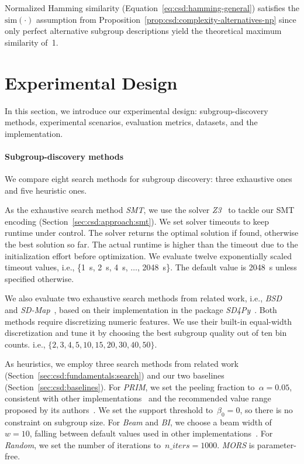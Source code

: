 \documentclass[acmsmall]{acmart} %
\theoremstyle{acmplain}
\theoremstyle{acmdefinition}
\begin{document}
%
Normalized Hamming similarity (Equation~\ref{eq:csd:hamming-general}) satisfies the $\text{sim}(\cdot)$ assumption from Proposition~\ref{prop:csd:complexity-alternatives-np} since only perfect alternative subgroup descriptions yield the theoretical maximum similarity of~1.

\section{Experimental Design}
\label{sec:csd:experimental-design}

In this section, we introduce our experimental design:
subgroup-discovery methods, experimental scenarios, evaluation metrics, datasets, and the implementation.

\paragraph{Subgroup-discovery methods}

We compare eight search methods for subgroup discovery:
three exhaustive ones and five heuristic ones.

As the exhaustive search method \emph{SMT}, we use the solver \emph{Z3}~\cite{bjorner2015nuz, deMoura2008z3} to tackle our SMT encoding (Section~\ref{sec:csd:approach:smt}).
We set solver timeouts to keep runtime under control.
The solver returns the optimal solution if found, otherwise the best solution so far. 
The actual runtime is higher than the timeout due to the initialization effort before optimization.
We evaluate twelve exponentially scaled timeout values, i.e., \{1~s, 2~s, 4~s, $\dots$, 2048~s\}.
The default value is 2048~s unless specified otherwise.

We also evaluate two exhaustive search methods from related work, i.e., \emph{BSD}~\cite{lemmerich2010fast} and \emph{SD-Map}~\cite{atzmueller2006sd}, based on their implementation in the package \emph{SD4Py}~\cite{hudson2023subgroup}.
Both methods require discretizing numeric features.
We use their built-in equal-width discretization and tune it by choosing the best subgroup quality out of ten bin counts. i.e., $\{2, 3, 4, 5, 10, 15, 20, 30, 40, 50\}$.

As heuristics, we employ three search methods from related work (Section~\ref{sec:csd:fundamentals:search}) and our two baselines (Section~\ref{sec:csd:baselines}).
For \emph{PRIM}, we set the peeling fraction to~$\alpha = 0.05$, consistent with other implementations~\cite{arzamasov2021reds, kwakkel2017exploratory} and the recommended value range proposed by its authors~\cite{friedman1999bump}.
We set the support threshold to~$\beta_0 = 0$, so there is no constraint on subgroup size.
For \emph{Beam} and \emph{BI}, we choose a beam width of $w=10$, falling between default values used in other implementations~\cite{arzamasov2021reds, lemmerich2019pysubgroup}.
For \emph{Random}, we set the number of iterations to~$\mathit{n\_iters} = 1000$.
\emph{MORS} is parameter-free.
\end{document}
